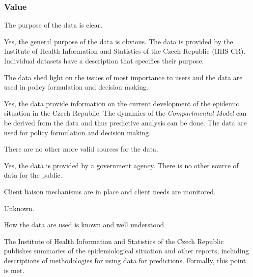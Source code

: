 \subsubsection{Value}

\begin{QandA}
    \item The purpose of the data is clear.
    \begin{answered}
        Yes, the general purpose of the data is obvious.
        The data is provided by the Institute of Health Information and Statistics of the Czech Republic (IHIS CR).
        Individual datasets have a description that specifies their purpose.
    \end{answered}

    \item The data shed light on the issues of most importance to users and the data are used in policy formulation and decision making.
    \begin{answered}
        Yes, the data provide information on the current development of the epidemic situation in the Czech Republic.
        The dynamics of the \textit{Compartmental Model} can be derived from the data and thus predictive analysis can be done.
        The data are used for policy formulation and decision making.
    \end{answered}

    \item There are no other more valid sources for the data.
    \begin{answered}
        Yes, the data is provided by a government agency.
        There is no other source of data for the public.
    \end{answered}

    \item Client liaison mechanisms are in place and client needs are monitored.
    \begin{answered}
        Unknown.
    \end{answered}

    \item How the data are used is known and well understood.
    \begin{answered}
        The Institute of Health Information and Statistics of the Czech Republic publishes summaries of the epidemiological situation and other reports, including descriptions of methodologies for using data for predictions.
        Formally, this point is met.
    \end{answered}


\end{QandA}
